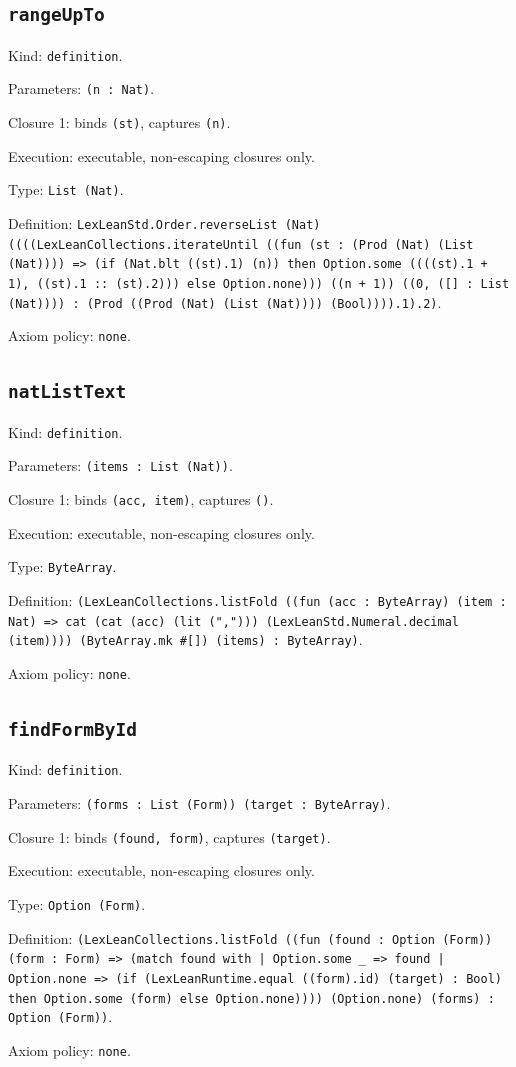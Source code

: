 \documentclass[11pt]{article}
\begin{document}
\subsection*{\texttt{rangeUpTo}}
\noindent Kind: \texttt{definition}.\par
\noindent Parameters: \texttt{(n : Nat)}.\par
\noindent Closure 1: binds \texttt{(st)}, captures \texttt{(n)}.\par
\noindent Execution: executable, non-escaping closures only.\par
\noindent Type: \texttt{List (Nat)}.\par
\noindent Definition: \texttt{LexLeanStd.Order.reverseList (Nat) ((((LexLeanCollections.iterateUntil ((fun (st : (Prod (Nat) (List (Nat)))) => (if (Nat.blt ((st).1) (n)) then Option.some ((((st).1 + 1), ((st).1 :: (st).2))) else Option.none))) ((n + 1)) ((0, ([] : List (Nat)))) : (Prod ((Prod (Nat) (List (Nat)))) (Bool)))).1).2)}.\par
\noindent Axiom policy: \texttt{none}.\par
\subsection*{\texttt{natListText}}
\noindent Kind: \texttt{definition}.\par
\noindent Parameters: \texttt{(items : List (Nat))}.\par
\noindent Closure 1: binds \texttt{(acc, item)}, captures \texttt{()}.\par
\noindent Execution: executable, non-escaping closures only.\par
\noindent Type: \texttt{ByteArray}.\par
\noindent Definition: \texttt{(LexLeanCollections.listFold ((fun (acc : ByteArray) (item : Nat) => cat (cat (acc) (lit (","))) (LexLeanStd.Numeral.decimal (item)))) (ByteArray.mk \#[]) (items) : ByteArray)}.\par
\noindent Axiom policy: \texttt{none}.\par
\subsection*{\texttt{findFormById}}
\noindent Kind: \texttt{definition}.\par
\noindent Parameters: \texttt{(forms : List (Form)) (target : ByteArray)}.\par
\noindent Closure 1: binds \texttt{(found, form)}, captures \texttt{(target)}.\par
\noindent Execution: executable, non-escaping closures only.\par
\noindent Type: \texttt{Option (Form)}.\par
\noindent Definition: \texttt{(LexLeanCollections.listFold ((fun (found : Option (Form)) (form : Form) => (match found with | Option.some \_ => found | Option.none => (if (LexLeanRuntime.equal ((form).id) (target) : Bool) then Option.some (form) else Option.none)))) (Option.none) (forms) : Option (Form))}.\par
\noindent Axiom policy: \texttt{none}.\par
\end{document}
